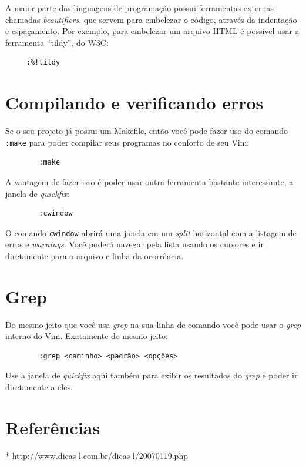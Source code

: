 \documentclass[10pt,a4paper,openany]{book}
\begin{document}
A maior parte das linguagens de programação possui ferramentas
externas chamadas {\em beautifiers}, que servem para embelezar o código,
através da indentação e espaçamento. Por exemplo, para embelezar um
arquivo HTML é possível usar a ferramenta ``tildy'', do W3C:

\begin{verbatim}
     :%!tildy
\end{verbatim}

\section{Compilando e verificando erros}
Se o seu projeto já possui um Makefile, então você pode fazer uso do comando
{\tt :make} para poder compilar seus programas no conforto de seu Vim:

\begin{verbatim}
		:make
\end{verbatim}

A vantagem de fazer isso é poder usar outra ferramenta bastante interessante, a janela
de {\em quickfix}:

\begin{verbatim}
		:cwindow
\end{verbatim}

O comando {\tt cwindow} abrirá uma janela em um {\em split} horizontal com a
listagem de erros e {\em warnings}.  Você poderá navegar pela lista usando os
cursores e ir diretamente para o arquivo e linha da ocorrência.

\section{Grep}

Do mesmo jeito que você usa {\em grep} na sua linha de comando você pode usar
o {\em grep} interno do Vim. Exatamente do mesmo jeito:

\begin{verbatim}
		:grep <caminho> <padrão> <opções>
\end{verbatim}

Use a janela de {\em quickfix} aqui também para exibir os resultados do {\em
grep} e poder ir diretamente 
a eles.

\section{Referências}
* \url{http://www.dicas-l.com.br/dicas-l/20070119.php}
\end{document}
